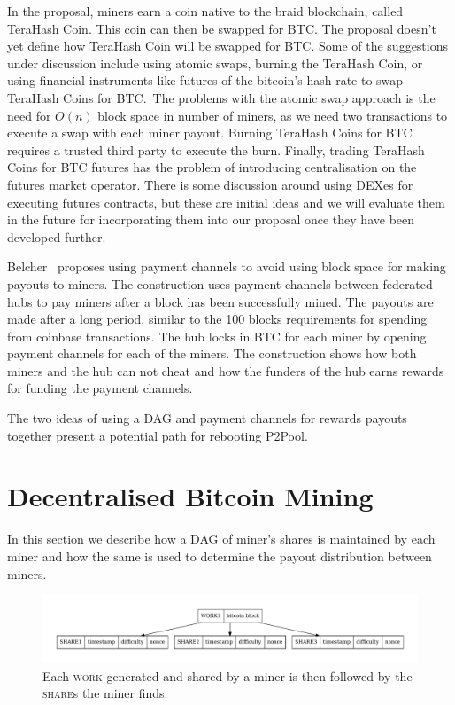 \documentclass{article}
\begin{document}
In the proposal, miners earn a coin native to the braid blockchain,
called TeraHash Coin. This coin can then be swapped for BTC. The
proposal doesn't yet define how TeraHash Coin will be swapped for
BTC. Some of the suggestions under discussion include using atomic
swaps, burning the TeraHash Coin, or using financial instruments like
futures of the bitcoin's hash rate to swap TeraHash Coins for BTC.\
The problems with the atomic swap approach is the need for $O(n)$
block space in number of miners, as we need two transactions to
execute a swap with each miner payout. Burning TeraHash Coins for BTC
requires a trusted third party to execute the burn. Finally, trading
TeraHash Coins for BTC futures has the problem of introducing
centralisation on the futures market operator. There is some
discussion around using DEXes for executing futures contracts, but
these are initial ideas and we will evaluate them in the future for
incorporating them into our proposal once they have been developed
further.

Belcher~\cite{channels-for-rewards} proposes using payment channels to
avoid using block space for making payouts to miners. The construction
uses payment channels between federated hubs to pay miners after a
block has been successfully mined. The payouts are made after a long
period, similar to the 100 blocks requirements for spending from
coinbase transactions. The hub locks in BTC for each miner by opening
payment channels for each of the miners. The construction shows how
both miners and the hub can not cheat and how the funders of the hub
earns rewards for funding the payment channels.

The two ideas of using a DAG and payment channels for rewards
payouts together present a potential path for rebooting P2Pool.

\section{Decentralised Bitcoin Mining}

In this section we describe how a DAG of miner's shares is maintained
by each miner and how the same is used to determine the payout
distribution between miners.

\begin{figure}
  \begin{center}
    \includegraphics[width=1\textwidth]{work-share}
    \caption{Each \textsc{work} generated and shared by a miner is then
      followed by the \textsc{share}s the miner finds.}\label{fig:work-share}
    \end{center}
\end{figure}
\end{document}
